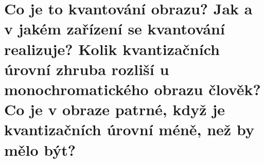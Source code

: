 \section{Co je to kvantování obrazu? Jak a v jakém zařízení se kvantování realizuje? Kolik kvantizačních úrovní zhruba 
rozliší u monochromatického obrazu člověk? Co je v obraze patrné, když je kvantizačních úrovní méně, než by mělo být?}